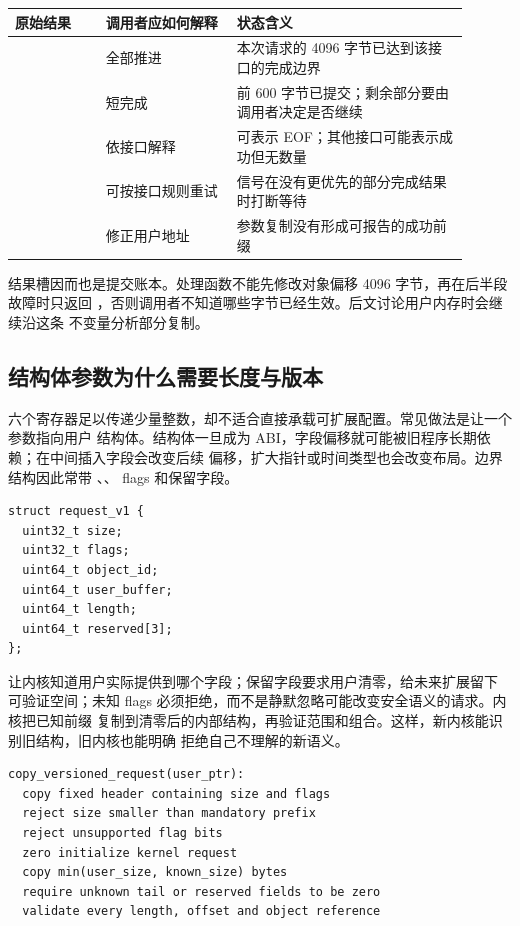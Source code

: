 \begin{longtable}{|L{0.18\linewidth}|L{0.26\linewidth}|L{0.46\linewidth}|}
\hline
原始结果 & 调用者应如何解释 & 状态含义 \\ \hline
{} & 全部推进 & 本次请求的 4096 字节已达到该接口的完成边界 \\ \hline
{} & 短完成 & 前 600 字节已提交；剩余部分要由调用者决定是否继续 \\ \hline
{} & 依接口解释 &  可表示 EOF；其他接口可能表示成功但无数量 \\ \hline
{} & 可按接口规则重试 & 信号在没有更优先的部分完成结果时打断等待 \\ \hline
{} & 修正用户地址 & 参数复制没有形成可报告的成功前缀 \\ \hline
\end{longtable}

结果槽因而也是提交账本。处理函数不能先修改对象偏移 4096 字节，再在后半段故障时只返回
，否则调用者不知道哪些字节已经生效。后文讨论用户内存时会继续沿这条
不变量分析部分复制。

\subsection{结构体参数为什么需要长度与版本}

六个寄存器足以传递少量整数，却不适合直接承载可扩展配置。常见做法是让一个参数指向用户
结构体。结构体一旦成为 ABI，字段偏移就可能被旧程序长期依赖；在中间插入字段会改变后续
偏移，扩大指针或时间类型也会改变布局。边界结构因此常带 、、
flags 和保留字段。

\begin{lstlisting}
struct request_v1 {
  uint32_t size;
  uint32_t flags;
  uint64_t object_id;
  uint64_t user_buffer;
  uint64_t length;
  uint64_t reserved[3];
};
\end{lstlisting}

 让内核知道用户实际提供到哪个字段；保留字段要求用户清零，给未来扩展留下
可验证空间；未知 flags 必须拒绝，而不是静默忽略可能改变安全语义的请求。内核把已知前缀
复制到清零后的内部结构，再验证范围和组合。这样，新内核能识别旧结构，旧内核也能明确
拒绝自己不理解的新语义。

\begin{lstlisting}
copy_versioned_request(user_ptr):
  copy fixed header containing size and flags
  reject size smaller than mandatory prefix
  reject unsupported flag bits
  zero initialize kernel request
  copy min(user_size, known_size) bytes
  require unknown tail or reserved fields to be zero
  validate every length, offset and object reference
\end{lstlisting}

